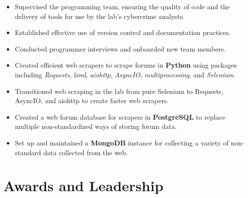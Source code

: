 \documentclass[10pt]{setzerresume}
\begin{document}

  \begin{itemize}[nosep]%

    \item Supervised the programming team, ensuring the quality of code and the delivery of tools for use by the lab's cybercrime analysts.
    \item Established effective use of version control and documentation practices.
    \item Conducted programmer interviews and onboarded new team members.
    \item Created efficient web scrapers to scrape forums in \textbf{Python} using packages including \textit{Requests}, \textit{lxml}, \textit{aiohttp}, \textit{AsyncIO}, \textit{multiprocessing}, and \textit{Selenium}.
    \item Transitioned web scraping in the lab from pure Selenium to Requests, AsyncIO, and aiohttp to create faster web scrapers.
    \item Created a web forum database for scrapers in \textbf{PostgreSQL} to replace multiple non-standardized ways of storing forum data.
    \item Set up and maintained a \textbf{MongoDB} instance for collecting a variety of non-standard data collected from the web.
          
  \end{itemize}






  \section{Awards and Leadership}
\end{document}
